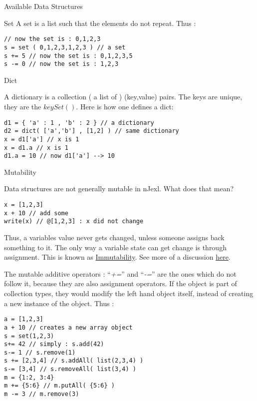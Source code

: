 \begin{section}{Available Data Structures}
\begin{subsection}{Set}
A set is a list such that the elements do not repeat.
Thus :

\begin{lstlisting}[style=JexlStyle]
// now the set is : 0,1,2,3
s = set ( 0,1,2,3,1,2,3 ) // a set  
s += 5 // now the set is : 0,1,2,3,5 
s -= 0 // now the set is : 1,2,3
\end{lstlisting}
\end{subsection}

\begin{subsection}{Dict}

A dictionary is a collection ( a list of ) (key,value) pairs.
The keys are unique, they are the $keySet()$. Here is how one defines a dict:

\begin{lstlisting}[style=JexlStyle]
d1 = { 'a' : 1 , 'b' : 2 } // a dictionary   
d2 = dict( ['a','b'] , [1,2] ) // same dictionary  
x = d1['a'] // x is 1
x = d1.a // x is 1 
d1.a = 10 // now d1['a'] --> 10 
\end{lstlisting}
\end{subsection}

\begin{subsection}{Mutability}

Data structures are not generally mutable in nJexl.
What does that mean?
\begin{lstlisting}[style=JexlStyle]
x = [1,2,3]
x + 10 // add some 
write(x) // @[1,2,3] : x did not change
\end{lstlisting}
Thus, a variables value never gets changed, unless someone assigns
back something to it. The only way a variable state can get 
change is through assignment. This is known as \href{https://en.wikipedia.org/wiki/Immutable_object}{Immutability}.
See more of a discussion \href{http://programmers.stackexchange.com/questions/151733/if-immutable-objects-are-good-why-do-people-keep-creating-mutable-objects}{here}.

The mutable additive operators : ``\emph{+=}'' and ``\emph{-=}'' are the ones which do not follow it, because
they are also assignment operators. If the object is part of collection types, they would modify the left hand object itself, 
instead of creating a new instance of the object. Thus :

\begin{lstlisting}[style=JexlStyle]
a = [1,2,3]
a + 10 // creates a new array object  
s = set(1,2,3)
s+= 42 // simply : s.add(42)
s-= 1 // s.remove(1)
s += [2,3,4] // s.addAll( list(2,3,4) )
s-= [3,4] // s.removeAll( list(3,4) )
m = {1:2, 3:4}
m += {5:6} // m.putAll( {5:6} )
m -= 3 // m.remove(3)
\end{lstlisting}

\end{subsection}

\end{section}

